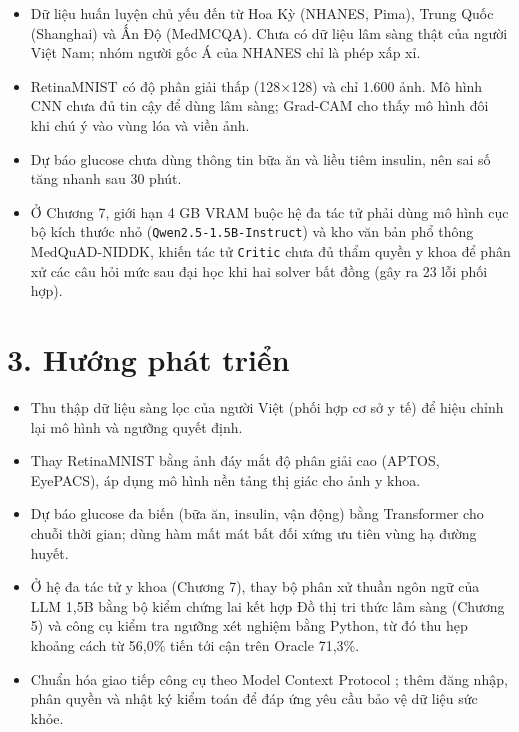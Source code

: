 \begin{itemize}
  \item Dữ liệu huấn luyện chủ yếu đến từ Hoa Kỳ (NHANES, Pima), Trung Quốc (Shanghai) và Ấn Độ (MedMCQA). Chưa có dữ liệu lâm sàng thật của người Việt Nam; nhóm người gốc Á của NHANES chỉ là phép xấp xỉ.
  \item RetinaMNIST có độ phân giải thấp (128×128) và chỉ 1.600 ảnh. Mô hình CNN chưa đủ tin cậy để dùng lâm sàng; Grad-CAM cho thấy mô hình đôi khi chú ý vào vùng lóa và viền ảnh.
  \item Dự báo glucose chưa dùng thông tin bữa ăn và liều tiêm insulin, nên sai số tăng nhanh sau 30 phút.
  \item Ở Chương 7, giới hạn 4 GB VRAM buộc hệ đa tác tử phải dùng mô hình cục bộ kích thước nhỏ (\texttt{Qwen2.5-1.5B-Instruct}) và kho văn bản phổ thông MedQuAD-NIDDK, khiến tác tử \texttt{Critic} chưa đủ thẩm quyền y khoa để phân xử các câu hỏi mức sau đại học khi hai solver bất đồng (gây ra 23 lỗi phối hợp).
\end{itemize}

\section*{3. Hướng phát triển}

\begin{itemize}
  \item Thu thập dữ liệu sàng lọc của người Việt (phối hợp cơ sở y tế) để hiệu chỉnh lại mô hình và ngưỡng quyết định.
  \item Thay RetinaMNIST bằng ảnh đáy mắt độ phân giải cao (APTOS, EyePACS), áp dụng mô hình nền tảng thị giác cho ảnh y khoa.
  \item Dự báo glucose đa biến (bữa ăn, insulin, vận động) bằng Transformer cho chuỗi thời gian; dùng hàm mất mát bất đối xứng ưu tiên vùng hạ đường huyết.
  \item Ở hệ đa tác tử y khoa (Chương 7), thay bộ phân xử thuần ngôn ngữ của LLM 1,5B bằng bộ kiểm chứng lai kết hợp Đồ thị tri thức lâm sàng (Chương 5) và công cụ kiểm tra ngưỡng xét nghiệm bằng Python, từ đó thu hẹp khoảng cách từ 56,0\% tiến tới cận trên Oracle 71,3\%.
  \item Chuẩn hóa giao tiếp công cụ theo Model Context Protocol \cite{mcp2024}; thêm đăng nhập, phân quyền và nhật ký kiểm toán để đáp ứng yêu cầu bảo vệ dữ liệu sức khỏe.
\end{itemize}
